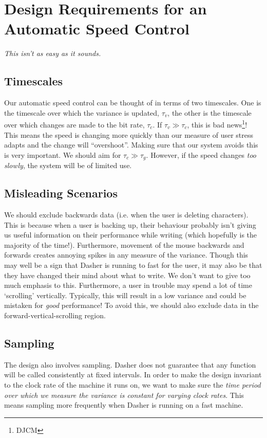 \documentclass[a4paper,11pt,notitlepage]{article}
\begin{document}
\section{Design Requirements for an Automatic Speed Control}

\emph{This isn't as easy as it sounds.}

\subsection{Timescales}\label{item:time} 

Our automatic speed control can be thought of in terms of two
timescales. One is the timescale over which the variance is updated,
$\tau_v$, the other is the timescale over which changes are made to
the bit rate, $\tau_c$. If $\tau_v \gg \tau_c$, this is bad
news\footnote{DJCM}! This means the speed is changing more quickly
than our measure of user stress adapts and the change will
``overshoot''. Making sure that our system avoids this is very
important. We should aim for $\tau_c \gg \tau_g$. However, if the
speed changes \emph{too slowly}, the system will be of limited use.

\subsection{Misleading Scenarios}\label{item:back} 

We should exclude backwards data (i.e. when the user is deleting
characters). This is because when a user is backing up, their
behaviour probably isn't giving us useful information on their
performance while writing (which hopefully is the majority of the
time!). Furthermore, movement of the mouse backwards and forwards
creates annoying spikes in any measure of the variance. Though this
may well be a sign that Dasher is running to fast for the user, it may
also be that they have changed their mind about what to write. We
don't want to give too much emphasis to this. Furthermore, a user in
trouble may spend a lot of time `scrolling' vertically. Typically,
this will result in a low variance and could be mistaken for
\emph{good} performance! To avoid this, we should also exclude data in
the forward-vertical-scrolling region.

\subsection{Sampling}\label{item:samp} 

The design also involves sampling. Dasher does not guarantee that any
function will be called consistently at fixed intervals. In order to
make the design invariant to the clock rate of the machine it runs on,
we want to make sure the \emph{time period over which we measure the
variance is constant for varying clock rates}. This means sampling
more frequently when Dasher is running on a fast machine.
\end{document}
